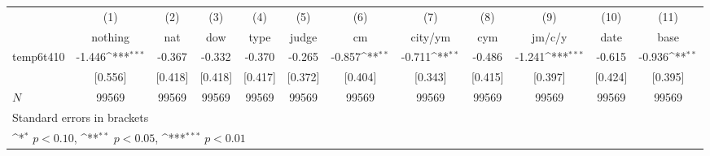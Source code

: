 {
\def\sym#1{\ifmmode^{#1}\else\(^{#1}\)\fi}
\begin{tabular}{l*{11}{c}}
\hline\hline
            &\multicolumn{1}{c}{(1)}&\multicolumn{1}{c}{(2)}&\multicolumn{1}{c}{(3)}&\multicolumn{1}{c}{(4)}&\multicolumn{1}{c}{(5)}&\multicolumn{1}{c}{(6)}&\multicolumn{1}{c}{(7)}&\multicolumn{1}{c}{(8)}&\multicolumn{1}{c}{(9)}&\multicolumn{1}{c}{(10)}&\multicolumn{1}{c}{(11)}\\
            &\multicolumn{1}{c}{nothing}&\multicolumn{1}{c}{nat}&\multicolumn{1}{c}{dow}&\multicolumn{1}{c}{type}&\multicolumn{1}{c}{judge}&\multicolumn{1}{c}{cm}&\multicolumn{1}{c}{city/ym}&\multicolumn{1}{c}{cym}&\multicolumn{1}{c}{jm/c/y}&\multicolumn{1}{c}{date}&\multicolumn{1}{c}{base}\\
\hline
temp6t410   &      -1.446\sym{***}&      -0.367         &      -0.332         &      -0.370         &      -0.265         &      -0.857\sym{**} &      -0.711\sym{**} &      -0.486         &      -1.241\sym{***}&      -0.615         &      -0.936\sym{**} \\
            &     [0.556]         &     [0.418]         &     [0.418]         &     [0.417]         &     [0.372]         &     [0.404]         &     [0.343]         &     [0.415]         &     [0.397]         &     [0.424]         &     [0.395]         \\
\hline
\(N\)       &       99569         &       99569         &       99569         &       99569         &       99569         &       99569         &       99569         &       99569         &       99569         &       99569         &       99569         \\
\hline\hline
\multicolumn{12}{l}{\footnotesize Standard errors in brackets}\\
\multicolumn{12}{l}{\footnotesize \sym{*} \(p<0.10\), \sym{**} \(p<0.05\), \sym{***} \(p<0.01\)}\\
\end{tabular}
}

